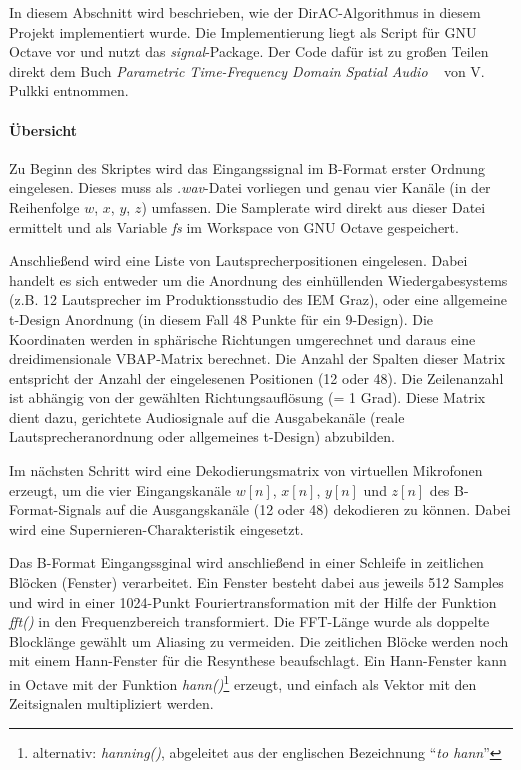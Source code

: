 In diesem Abschnitt wird beschrieben, wie der DirAC-Algorithmus in diesem Projekt implementiert wurde. Die Implementierung liegt als Script für GNU Octave vor und nutzt das \textit{signal}-Package. Der Code dafür ist zu großen Teilen direkt dem Buch \textit{Parametric Time-Frequency Domain Spatial Audio} ~\cite{spatial-book} von V. Pulkki entnommen.

\paragraph{Übersicht}
Zu Beginn des Skriptes wird das Eingangssignal im B-Format erster Ordnung eingelesen. Dieses muss als \textit{.wav}-Datei vorliegen und genau vier Kanäle (in der Reihenfolge $w$, $x$, $y$, $z$) umfassen. Die Samplerate wird direkt aus dieser Datei ermittelt und als Variable \textit{fs} im Workspace von GNU Octave gespeichert.

Anschließend wird eine Liste von Lautsprecherpositionen eingelesen. Dabei handelt es sich entweder um die Anordnung des einhüllenden Wiedergabesystems (z.B. 12 Lautsprecher im Produktionsstudio des IEM Graz), oder eine allgemeine t-Design Anordnung (in diesem Fall 48 Punkte für ein 9-Design). Die Koordinaten werden in sphärische Richtungen umgerechnet und daraus eine dreidimensionale VBAP-Matrix berechnet. Die Anzahl der Spalten dieser Matrix entspricht der Anzahl der eingelesenen Positionen (12 oder 48). Die Zeilenanzahl ist abhängig von der gewählten Richtungsauflösung (= 1 Grad). Diese Matrix dient dazu, gerichtete Audiosignale auf die Ausgabekanäle (reale Lautsprecheranordnung oder allgemeines t-Design) abzubilden.

Im nächsten Schritt wird eine Dekodierungsmatrix von virtuellen Mikrofonen erzeugt, um die vier Eingangskanäle $w[n]$, $x[n]$, $y[n]$ und $z[n]$ des B-Format-Signals auf die Ausgangskanäle (12 oder 48) dekodieren zu können. Dabei wird eine Supernieren-Charakteristik eingesetzt.

Das B-Format Eingangssginal wird anschließend in einer Schleife in zeitlichen Blöcken (Fenster) verarbeitet. Ein Fenster besteht dabei aus jeweils 512 Samples und wird in einer 1024-Punkt Fouriertransformation mit der Hilfe der Funktion \textit{fft()} in den Frequenzbereich transformiert. Die FFT-Länge wurde als doppelte Blocklänge gewählt um Aliasing zu vermeiden. Die zeitlichen Blöcke werden noch mit einem Hann-Fenster für die Resynthese beaufschlagt. Ein Hann-Fenster kann in Octave mit der Funktion \textit{hann()}\footnote{alternativ: \textit{hanning()}, abgeleitet aus der englischen Bezeichnung ``\textit{to hann}''} erzeugt, und einfach als Vektor mit den Zeitsignalen multipliziert werden.